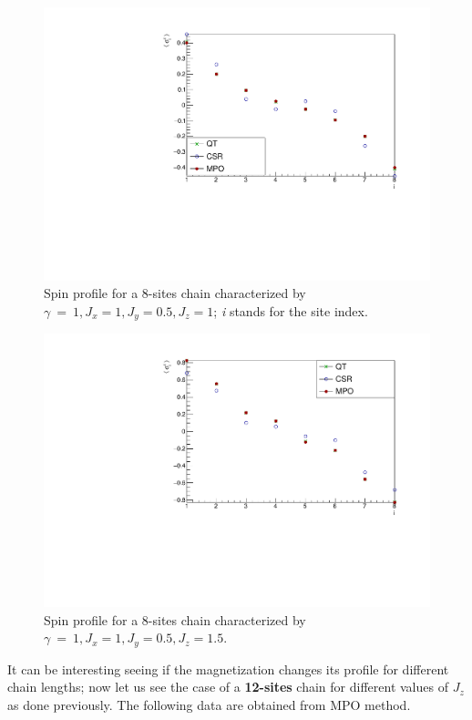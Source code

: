 \begin{figure}[H]
    \centering
    \includegraphics[scale=0.7]{Figures/8sites_comparison/LMComparison_8sJ1051.pdf}
    \caption{Spin profile for a 8-sites chain characterized by $\gamma~=~1, J_x=1, J_y=0.5, J_z=1$; \emph{i} stands for the site index.}
    \label{fig:8sites_LMcomparisonJz1}
\end{figure}

\begin{figure}[H]
    \centering
    \includegraphics[scale=0.7]{Figures/8sites_comparison/LM_8s_J10515.pdf}
    \caption{Spin profile for a 8-sites chain characterized by $\gamma~=~1, J_x=1, J_y=0.5, J_z=1.5$.}
    \label{fig:my_label}
\end{figure}

It can be interesting seeing if the magnetization changes its profile for different chain lengths; now let us see the case of a \textbf{12-sites} chain for different values of $J_z$ as done previously. The following data are obtained from MPO method.

